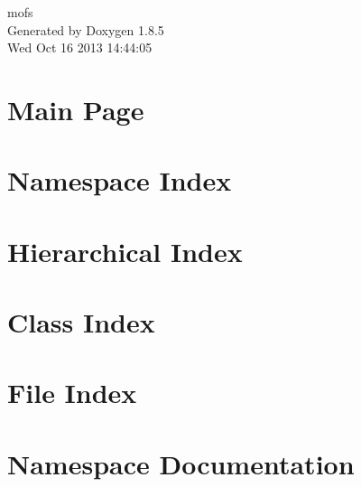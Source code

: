 \documentclass[twoside]{book}
\newcommand{\clearemptydoublepage}{%
  \newpage{\pagestyle{empty}\cleardoublepage}%
}
\begin{document}
\begin{titlepage}
\vspace*{7cm}
\begin{center}%
{\Large mofs }\\
\vspace*{1cm}
{\large Generated by Doxygen 1.8.5}\\
\vspace*{0.5cm}
{\small Wed Oct 16 2013 14:44:05}\\
\end{center}
\end{titlepage}
\clearemptydoublepage
\tableofcontents
\clearemptydoublepage
{}

\chapter{Main Page}
\label{index}
\chapter{Namespace Index}

\chapter{Hierarchical Index}

\chapter{Class Index}

\chapter{File Index}

\chapter{Namespace Documentation}







\end{document}
